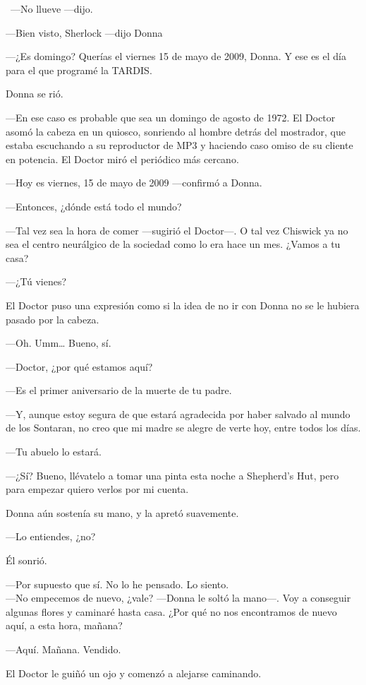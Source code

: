 ~---No llueve ---dijo.

---Bien visto, Sherlock ---dijo Donna

---¿Es domingo? Querías el viernes 15 de mayo de 2009, Donna. Y ese es
el día para el que programé la TARDIS.

Donna se rió.

---En ese caso es probable que sea un domingo de agosto de 1972. El
Doctor asomó la cabeza en un quiosco, sonriendo al hombre detrás del
mostrador, que estaba escuchando a su reproductor de MP3 y haciendo caso
omiso de su cliente en potencia. El Doctor miró el periódico más
cercano.

---Hoy es viernes, 15 de mayo de 2009 ---confirmó a Donna.

---Entonces, ¿dónde está todo el mundo?

---Tal vez sea la hora de comer ---sugirió el Doctor---. O tal vez
Chiswick ya no sea el centro neurálgico de la sociedad como lo era hace
un mes. ¿Vamos a tu casa?

---¿Tú vienes?

El Doctor puso una expresión como si la idea de no ir con Donna no se le
hubiera pasado por la cabeza.

---Oh. Umm\ldots{} Bueno, sí.

---Doctor, ¿por qué estamos aquí?

---Es el primer aniversario de la muerte de tu padre.

---Y, aunque estoy segura de que estará agradecida por haber salvado al
mundo de los Sontaran, no creo que mi madre se alegre de verte hoy,
entre todos los días.

---Tu abuelo lo estará.

---¿Sí? Bueno, llévatelo a tomar una pinta esta noche a Shepherd's Hut,
pero para empezar quiero verlos por mi cuenta.

Donna aún sostenía su mano, y la apretó suavemente.

---Lo entiendes, ¿no?

Él sonrió.

---Por supuesto que sí. No lo he pensado. Lo siento. \\---No empecemos
de nuevo, ¿vale? ---Donna le soltó la mano---. Voy a conseguir algunas
flores y caminaré hasta casa. ¿Por qué no nos encontramos de nuevo aquí,
a esta hora, mañana?

---Aquí. Mañana. Vendido.

El Doctor le guiñó un ojo y comenzó a alejarse caminando.

